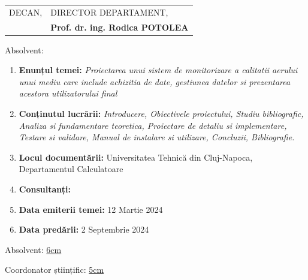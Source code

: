 \begin{tabular}{p{7cm}p{8cm}}
	\hspace{-1cm}DECAN, & DIRECTOR DEPARTAMENT,\\
	\hspace{-1cm}{\bf Prof. dr. ing. Vlad MUREȘAN} & {\bf Prof. dr. ing. Rodica POTOLEA}\\  
\end{tabular}

\vspace{2cm}

\begin{center}
	Absolvent: {\bf \thesisauthor}
	
	\vspace{1cm}
	
	{\bf \thesistitle}
\end{center}

\vspace{5mm}
\begin{enumerate}
	\item {\bf Enunțul temei:} {\it Proiectarea unui sistem de monitorizare a calitatii aerului unui mediu care include achizitia de date, gestiunea datelor 
	si prezentarea acestora utilizatorului final}
	\item {\bf Conținutul lucrării:} {\it Introducere, Obiectivele proiectului, Studiu bibliografic, Analiza si fundamentare teoretica, Proiectare de detaliu si 
	implementare, Testare si validare, Manual de instalare si utilizare, Concluzii, Bibliografie.}
	\item {\bf Locul documentării:} Universitatea Tehnică din Cluj-Napoca, Departamentul Calculatoare
	\item {\bf Consultanți:}
	\item {\bf Data emiterii temei:} 12 Martie 2024 %
	\item {\bf Data predării:} 2 Septembrie 2024 %
\end{enumerate}
\vspace{1.2cm}

\hspace{6cm} Absolvent: \uline{6cm} 

\vspace{0.5cm}
\hspace{6cm} Coordonator științific: \uline{5cm} 
\newpage
\begin{center}
	{\department}
\end{center}
\vspace{0.5cm}

